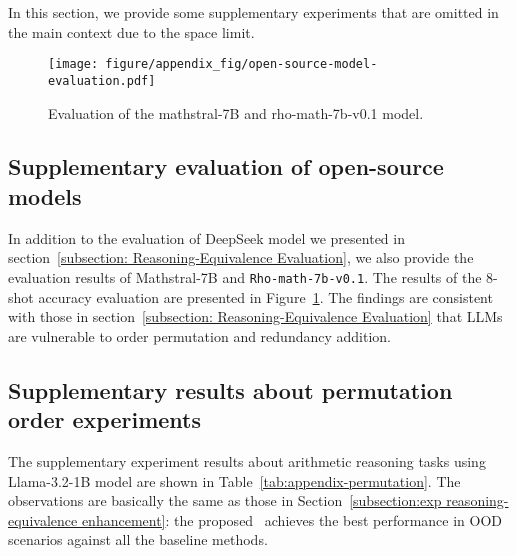 \label{sec:appendix-exp}
In this section, we provide some supplementary experiments that are omitted in the main context due to the space limit.

\begin{figure}[h]
    \centering
    \texttt{[image: figure/appendix\_fig/open-source-model-evaluation.pdf]}
    \caption{Evaluation of the {mathstral-7B} and {rho-math-7b-v0.1} model.}
    \label{fig: open model evaluation}
\end{figure}



\subsection{Supplementary evaluation of open-source models}
\label{subsection:appendix-open-source models}
In addition to the evaluation of DeepSeek model we presented in section~\ref{subsection: Reasoning-Equivalence Evaluation}, we also provide the evaluation results of {Mathstral-7B} and \texttt{Rho-math-7b-v0.1}. The results of the $8$-shot accuracy evaluation are presented in Figure~\ref{fig: open model evaluation}. The findings are consistent with those in section~\ref{subsection: Reasoning-Equivalence Evaluation} that LLMs are vulnerable to order permutation and redundancy addition.

\subsection{Supplementary results about permutation order experiments}
\label{subsection:appendix-permutation-order-experiments}

The supplementary experiment results about arithmetic reasoning tasks using {Llama-3.2-1B} model are shown in Table~\ref{tab:appendix-permutation}. The observations are basically the same as those in Section~\ref{subsection:exp reasoning-equivalence enhancement}: the proposed \method\ achieves the best performance in OOD scenarios against all the baseline methods.



